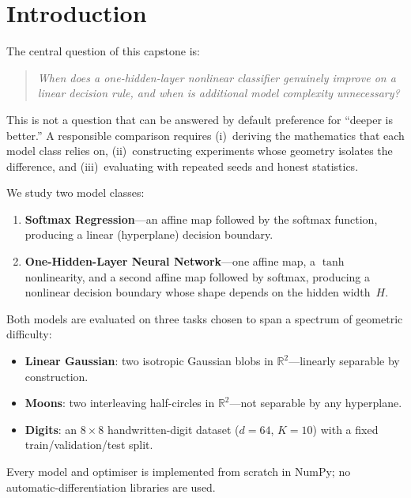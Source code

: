 \documentclass[11pt]{article}
\newcommand{\R}{\mathbb{R}}
\begin{document}
\section{Introduction}

The central question of this capstone is:
\begin{quote}
\itshape When does a one-hidden-layer nonlinear classifier genuinely improve on a linear
decision rule, and when is additional model complexity unnecessary?
\end{quote}

This is not a question that can be answered by default preference for ``deeper is better.''
A responsible comparison requires (i)~deriving the mathematics that each model class relies on,
(ii)~constructing experiments whose geometry isolates the difference, and
(iii)~evaluating with repeated seeds and honest statistics.

We study two model classes:
\begin{enumerate}[label=(\roman*),leftmargin=2em,itemsep=0.15em]
  \item \textbf{Softmax Regression}---an affine map followed by the softmax function, producing
        a linear (hyperplane) decision boundary.
  \item \textbf{One-Hidden-Layer Neural Network}---one affine map, a $\tanh$ nonlinearity, and a
        second affine map followed by softmax, producing a nonlinear decision boundary whose
        shape depends on the hidden width~$H$.
\end{enumerate}

Both models are evaluated on three tasks chosen to span a spectrum of geometric difficulty:
\begin{itemize}[leftmargin=1.4em,itemsep=0.15em]
  \item \textbf{Linear Gaussian}: two isotropic Gaussian blobs in $\R^2$---linearly separable by
        construction.
  \item \textbf{Moons}: two interleaving half-circles in $\R^2$---not separable by any
        hyperplane.
  \item \textbf{Digits}: an $8{\times}8$ handwritten-digit dataset ($d{=}64$, $K{=}10$) with a
        fixed train/validation/test split.
\end{itemize}

Every model and optimiser is implemented from scratch in NumPy; no automatic-differentiation
libraries are used.
\end{document}
